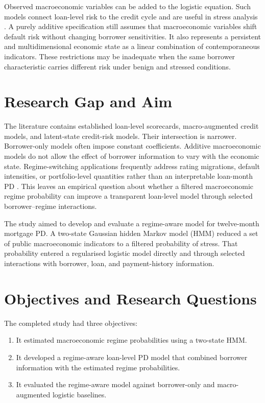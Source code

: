 Observed macroeconomic variables can be added to the logistic equation. Such models connect loan-level risk to the credit cycle and are useful in stress analysis \citep{bellotti2009credit,bellotti2013stress}. A purely additive specification still assumes that macroeconomic variables shift default risk without changing borrower sensitivities. It also represents a persistent and multidimensional economic state as a linear combination of contemporaneous indicators. These restrictions may be inadequate when the same borrower characteristic carries different risk under benign and stressed conditions.

\section{Research Gap and Aim}

The literature contains established loan-level scorecards, macro-augmented credit models, and latent-state credit-risk models. Their intersection is narrower. Borrower-only models often impose constant coefficients. Additive macroeconomic models do not allow the effect of borrower information to vary with the economic state. Regime-switching applications frequently address rating migrations, default intensities, or portfolio-level quantities rather than an interpretable loan-month PD \citep{bangia_et_al_2002,yu2018modeling}. This leaves an empirical question about whether a filtered macroeconomic regime probability can improve a transparent loan-level model through selected borrower--regime interactions.

The study aimed to develop and evaluate a regime-aware model for twelve-month mortgage PD. A two-state Gaussian hidden Markov model (HMM) reduced a set of public macroeconomic indicators to a filtered probability of stress. That probability entered a regularised logistic model directly and through selected interactions with borrower, loan, and payment-history information.

\section{Objectives and Research Questions}

The completed study had three objectives:
\begin{enumerate}
    \item It estimated macroeconomic regime probabilities using a two-state HMM.
    \item It developed a regime-aware loan-level PD model that combined borrower information with the estimated regime probabilities.
    \item It evaluated the regime-aware model against borrower-only and macro-augmented logistic baselines.
\end{enumerate}

